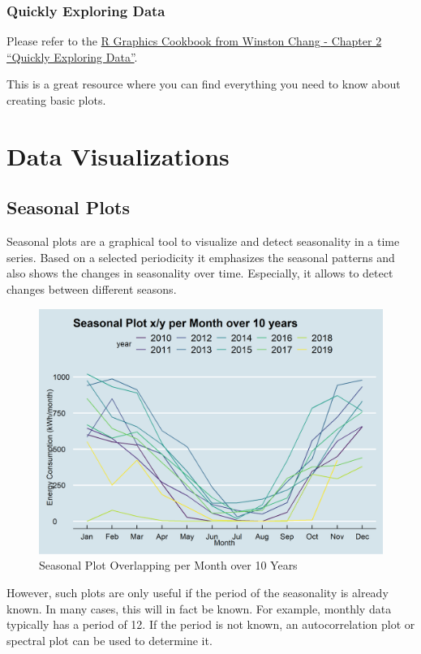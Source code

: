\documentclass[
]{book}
\begin{document}
\hypertarget{quickly-exploring-data}{%
\section{Quickly Exploring Data}\label{quickly-exploring-data}}

Please refer to the \href{https://r-graphics.org/chapter-quick}{R Graphics Cookbook from Winston Chang - Chapter 2 ``Quickly Exploring Data''}.

This is a great resource where you can find everything you need to know about creating basic plots.

\hypertarget{part-data-visualizations}{%
\part{Data Visualizations}\label{part-data-visualizations}}

\hypertarget{seasonal-plots}{%
\chapter{Seasonal Plots}\label{seasonal-plots}}

Seasonal plots are a graphical tool to visualize and detect seasonality in a time series. Based on a selected periodicity it emphasizes the seasonal patterns and also shows the changes in seasonality over time. Especially, it allows to detect changes between different seasons.

\begin{figure}
\includegraphics[width=0.7\linewidth]{images/plotSeasonalXY} \caption{Seasonal Plot Overlapping per Month over 10 Years}\label{fig:unnamed-chunk-8}
\end{figure}

However, such plots are only useful if the period of the seasonality is already known. In many cases, this will in fact be known. For example, monthly data typically has a period of 12. If the period is not known, an autocorrelation plot or spectral plot can be used to determine it.
\end{document}
